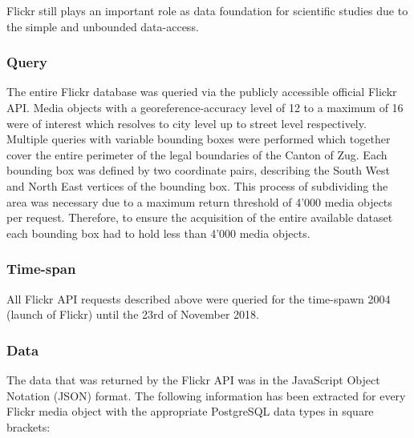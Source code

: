Flickr still plays an important role as data foundation for scientific studies due to the simple and unbounded data-access. 
\subsubsection{Query} \label{flickr_query}
The entire Flickr database was queried via the publicly accessible official Flickr API. Media objects with a georeference-accuracy level of 12 to a maximum of 16 were of interest which resolves to city level up to street level respectively. Multiple queries with variable bounding boxes were performed which together cover the entire perimeter of the legal boundaries of the Canton of Zug. Each bounding box was defined by two coordinate pairs, describing the South West and North East vertices of the bounding box. This process of subdividing the area was necessary due to a maximum return threshold of 4'000 media objects per request. Therefore, to ensure the acquisition of the entire available dataset each bounding box had to hold less than 4'000 media objects.

\subsubsection{Time-span} \label{flickr_timespan}
All Flickr API requests described above were queried for the time-spawn 2004 (launch of Flickr) until the 23rd of November 2018.

\subsubsection{Data} \label{flickr_data}
The data that was returned by the Flickr API was in the JavaScript Object Notation (JSON) format. The following information has been extracted for every Flickr media object with the appropriate PostgreSQL data types in square brackets:\\

